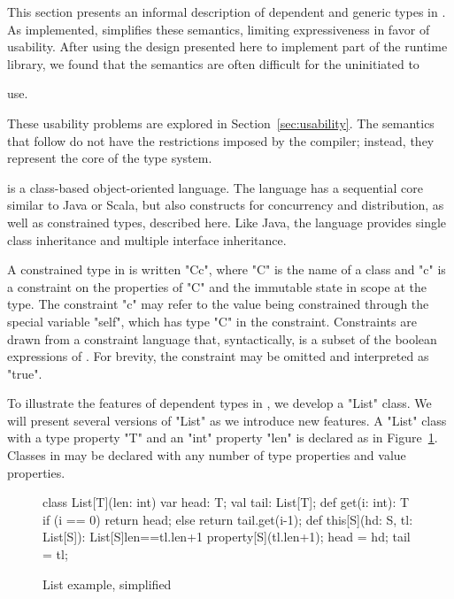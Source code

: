 
\newif\ifwild
\wildfalse

This section presents an informal description of 
dependent and generic types in \Xten{}.  
As implemented, \Xten simplifies these 
semantics, limiting expressiveness in favor of usability.
After
using the design presented here to implement part of the \Xten runtime library,
we found that the semantics are
often difficult for the uninitiated to
\ifwild
use---indeed, they
provide comparable expressive power to Java wildcards, whose usability
issues are well known~\cite{wildcards-are-evil}.
\else
use.
\fi
These usability problems are explored in Section~\ref{sec:usability}.
The semantics that follow do not have the restrictions
imposed by the \Xten compiler; instead, they represent the core
of the \Xten type system.

\Xten{} is a class-based object-oriented language.
The language has a sequential core similar to Java or Scala, but
also
constructs for concurrency and distribution, as well as constrained
types, described here.  Like Java, the language provides single class
inheritance and multiple interface inheritance.

A constrained type in \Xten{} is written \xcd"C{c}", where \xcd"C" is the
name of a class and \xcd"c" is a constraint on the properties
of \xcd"C" and the immutable state in scope at the type.  The
constraint \xcd"c" may refer to the value being constrained through
the special variable \xcd"self", which has type \xcd"C" in the
constraint.  Constraints are drawn from a constraint language that,
syntactically, is a subset of the boolean expressions of \Xten{}.  For
brevity, the constraint may be omitted and interpreted as \xcd"true".

To illustrate the features of dependent types in \Xten{}, we
develop a \xcd"List"
class.  We will present several versions of \xcd"List" as we
introduce new features.
A \xcd"List" class with a type property \xcd"T" and an \xcd"int"
property \xcd"len" is declared as in Figure~\ref{fig:list0}.
Classes in \Xten{} may be declared with any number of type properties and
value properties.

\begin{figure}
{
\begin{xtennoindent}
      class List[T](len: int) {
        var head: T;
        val tail: List[T];
        def get(i: int): T {
          if (i == 0) return head;
          else return tail.get(i-1);
        }
        def this[S](hd: S, tl: List[S]):
            List[S]{len==tl.len+1} {
          property[S](tl.len+1);
          head = hd; tail = tl;
        }
      }
\end{xtennoindent}
}
\caption{List example, simplified}
\label{fig:list0}
\end{figure}

